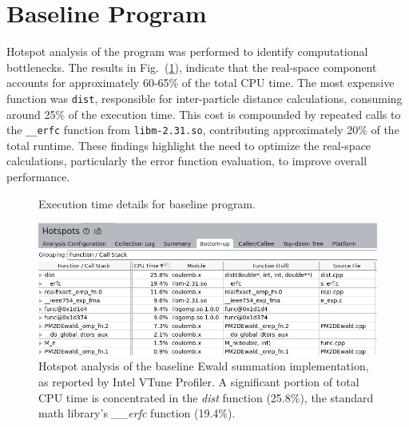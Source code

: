 \section{Baseline Program}
Hotspot analysis of the program was performed to identify computational bottlenecks. The results in Fig.~(\ref{fig:result1vtune}), indicate that the real-space component accounts for approximately 60-65\% of the total CPU time. The most expensive function was \texttt{dist}, responsible for inter-particle distance calculations, consuming around 25\% of the execution time. This cost is compounded by repeated calls to the \texttt{\_\_erfc} function from \texttt{libm-2.31.so}, contributing approximately 20\% of the total runtime. These findings highlight the need to optimize the real-space calculations, particularly the error function evaluation, to improve overall performance.
\begin{figure}[H]
    \centering
    \begin{minipage}{0.7\textwidth}
    \end{minipage}%
    \begin{minipage}{0.3\textwidth}
        \caption{Execution time details for baseline program.}
    \end{minipage}
\end{figure}
\begin{figure}[H]
    \centering
    \includegraphics[width = \linewidth]{images/VTuneInitialHotspot.png}
    \caption{Hotspot analysis of the baseline Ewald summation implementation, as reported by Intel VTune Profiler. A significant portion of total CPU time is concentrated in the \textit{dist} function (25.8\%), the standard math library's \textit{\_\_erfc} function (19.4\%).}
    \label{fig:result1vtune}
\end{figure}

